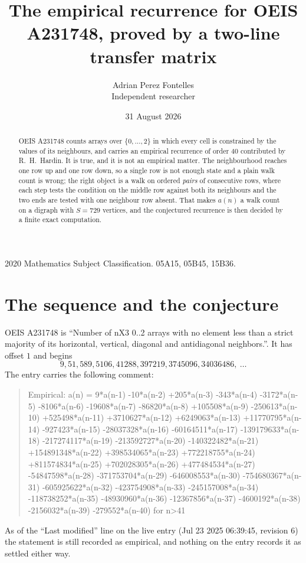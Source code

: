 \documentclass[11pt,a4paper]{article}
\title{The empirical recurrence for OEIS A231748, proved by a two-line transfer matrix}
\author{Adrian Perez Fontelles\\ \small Independent researcher}
\date{31 August 2026}
\theoremstyle{plain}
\theoremstyle{definition}
\begin{document}
\maketitle

\begin{abstract}
OEIS A231748 counts arrays over $\{0,\dots,2\}$ in which every cell is constrained by the
values of its neighbours, and carries an empirical recurrence of order $40$ contributed
by R.~H.~Hardin. It is true, and it is not an empirical matter. The neighbourhood reaches one
row up and one row down, so a single row is not enough state and a plain walk count
is wrong; the right object is a walk on ordered \emph{pairs} of consecutive rows, where
each step tests the condition on the middle row against both its neighbours and the two
ends are tested with one neighbour row absent. That makes $a(n)$ a walk count on a digraph
with $S=729$ vertices, and the conjectured recurrence is then decided by a finite exact
computation.
\end{abstract}

\noindent\small 2020 Mathematics Subject Classification. 05A15, 05B45, 15B36.\normalsize

\section{The sequence and the conjecture}

OEIS A231748 is ``Number of nX3 0..2 arrays with no element less than a strict majority of its horizontal, vertical, diagonal and antidiagonal neighbors.''. It has offset $1$ and begins
\[
9, 51, 589, 5106, 41288, 397219, 3745096, 34036486,\ \dots
\]
The entry carries the following comment:
\begin{quote}\small
Empirical: a(n) = 9*a(n-1) -10*a(n-2) +205*a(n-3) -343*a(n-4) -3172*a(n-5) -8106*a(n-6) -19608*a(n-7) -86820*a(n-8) +105508*a(n-9) -250613*a(n-10) +525498*a(n-11) +3710627*a(n-12) +6249063*a(n-13) +11770795*a(n-14) -927423*a(n-15) -28037328*a(n-16) -60164511*a(n-17) -139179633*a(n-18) -217274117*a(n-19) -213592727*a(n-20) -140322482*a(n-21) +154891348*a(n-22) +398534065*a(n-23) +772218755*a(n-24) +811574834*a(n-25) +702028305*a(n-26) +477484534*a(n-27) -54847598*a(n-28) -371753704*a(n-29) -646008553*a(n-30) -754680367*a(n-31) -605925622*a(n-32) -423754908*a(n-33) -245157008*a(n-34) -118738252*a(n-35) -48930960*a(n-36) -12367856*a(n-37) -4600192*a(n-38) -2156032*a(n-39) -279552*a(n-40) for n>41
\end{quote}
As of the ``Last modified'' line on the live entry (Jul 23 2025 06:39:45, revision 6) the statement is
still recorded as empirical, and nothing on the entry records it as settled either way.
\end{document}
